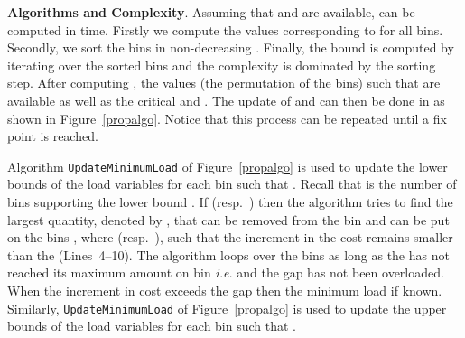 \noindent\textbf{Algorithms and Complexity}. Assuming that  and  are available,  can be computed in  time. Firstly we compute the  values corresponding to   for all bins. Secondly, we sort the bins in non-decreasing . Finally, the bound is computed by iterating over the sorted bins and the complexity is dominated by the sorting step. After computing , the values  (the permutation of the bins) such that  are available as well as the critical  and . The update of  and   can then be done in  as shown in Figure~\ref{propalgo}. Notice that this process can be repeated until a fix point is reached.

Algorithm \texttt{UpdateMinimumLoad} of Figure~\ref{propalgo} is used to update  the lower bounds of the load variables 
for each bin   such that . Recall that  is the number of bins supporting the lower bound .
If  (resp.\ ) then the algorithm tries to find  the largest quantity, denoted by , that can be removed
from the bin  and can be put on the bins , where  (resp.\ ),
such that the increment in the cost remains smaller than the  (Lines~4--10). 
The algorithm loops over the bins as long as the   has not reached its maximum amount on bin  \emph{i.e.}  and the gap has not been overloaded.
When the increment in cost exceeds the gap then the minimum load if known.
Similarly, \texttt{UpdateMinimumLoad} of Figure~\ref{propalgo} is used to update  the upper bounds of the load variables 
for each bin   such that .

